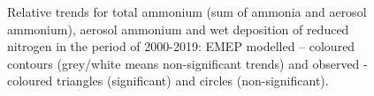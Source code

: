 \begin{figure}[h]
\caption{Relative trends for total ammonium (sum of ammonia and aerosol ammonium), aerosol ammonium and wet deposition of reduced nitrogen in the period of 2000-2019: EMEP modelled -- coloured contours (grey/white means non-significant trends) and
observed - coloured triangles (significant) and circles (non-significant).}
\label{fig:RDNtrends}
\end{figure}

